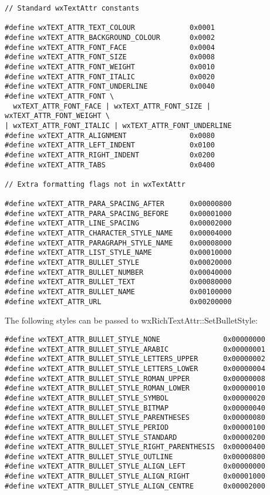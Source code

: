 {\small
\begin{verbatim}
// Standard wxTextAttr constants

#define wxTEXT_ATTR_TEXT_COLOUR             0x0001
#define wxTEXT_ATTR_BACKGROUND_COLOUR       0x0002
#define wxTEXT_ATTR_FONT_FACE               0x0004
#define wxTEXT_ATTR_FONT_SIZE               0x0008
#define wxTEXT_ATTR_FONT_WEIGHT             0x0010
#define wxTEXT_ATTR_FONT_ITALIC             0x0020
#define wxTEXT_ATTR_FONT_UNDERLINE          0x0040
#define wxTEXT_ATTR_FONT \
  wxTEXT_ATTR_FONT_FACE | wxTEXT_ATTR_FONT_SIZE | wxTEXT_ATTR_FONT_WEIGHT \
| wxTEXT_ATTR_FONT_ITALIC | wxTEXT_ATTR_FONT_UNDERLINE
#define wxTEXT_ATTR_ALIGNMENT               0x0080
#define wxTEXT_ATTR_LEFT_INDENT             0x0100
#define wxTEXT_ATTR_RIGHT_INDENT            0x0200
#define wxTEXT_ATTR_TABS                    0x0400

// Extra formatting flags not in wxTextAttr

#define wxTEXT_ATTR_PARA_SPACING_AFTER      0x00000800
#define wxTEXT_ATTR_PARA_SPACING_BEFORE     0x00001000
#define wxTEXT_ATTR_LINE_SPACING            0x00002000
#define wxTEXT_ATTR_CHARACTER_STYLE_NAME    0x00004000
#define wxTEXT_ATTR_PARAGRAPH_STYLE_NAME    0x00008000
#define wxTEXT_ATTR_LIST_STYLE_NAME         0x00010000
#define wxTEXT_ATTR_BULLET_STYLE            0x00020000
#define wxTEXT_ATTR_BULLET_NUMBER           0x00040000
#define wxTEXT_ATTR_BULLET_TEXT             0x00080000
#define wxTEXT_ATTR_BULLET_NAME             0x00100000
#define wxTEXT_ATTR_URL                     0x00200000
\end{verbatim}
}

The following styles can be passed to wxRichTextAttr::SetBulletStyle:

{\small
\begin{verbatim}
#define wxTEXT_ATTR_BULLET_STYLE_NONE               0x00000000
#define wxTEXT_ATTR_BULLET_STYLE_ARABIC             0x00000001
#define wxTEXT_ATTR_BULLET_STYLE_LETTERS_UPPER      0x00000002
#define wxTEXT_ATTR_BULLET_STYLE_LETTERS_LOWER      0x00000004
#define wxTEXT_ATTR_BULLET_STYLE_ROMAN_UPPER        0x00000008
#define wxTEXT_ATTR_BULLET_STYLE_ROMAN_LOWER        0x00000010
#define wxTEXT_ATTR_BULLET_STYLE_SYMBOL             0x00000020
#define wxTEXT_ATTR_BULLET_STYLE_BITMAP             0x00000040
#define wxTEXT_ATTR_BULLET_STYLE_PARENTHESES        0x00000080
#define wxTEXT_ATTR_BULLET_STYLE_PERIOD             0x00000100
#define wxTEXT_ATTR_BULLET_STYLE_STANDARD           0x00000200
#define wxTEXT_ATTR_BULLET_STYLE_RIGHT_PARENTHESIS  0x00000400
#define wxTEXT_ATTR_BULLET_STYLE_OUTLINE            0x00000800
#define wxTEXT_ATTR_BULLET_STYLE_ALIGN_LEFT         0x00000000
#define wxTEXT_ATTR_BULLET_STYLE_ALIGN_RIGHT        0x00001000
#define wxTEXT_ATTR_BULLET_STYLE_ALIGN_CENTRE       0x00002000
\end{verbatim}
}

